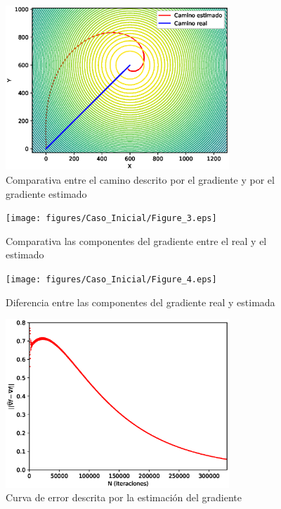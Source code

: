 \begin{figure}[htb]
\centering
\includegraphics[width=0.75\textwidth]{figures/Caso_Inicial/Caminos.eps}
\caption{Comparativa entre el camino descrito por el gradiente y por el gradiente estimado} \label{Dif_Caminos}
\end{figure}

\begin{figure}[H]
\centering
\texttt{[image: figures/Caso\_Inicial/Figure\_3.eps]}
\caption{Comparativa las componentes del gradiente entre el real y el estimado} \label{grad}
\end{figure}

\begin{figure}[H]
\centering
\texttt{[image: figures/Caso\_Inicial/Figure\_4.eps]}
\caption{Diferencia entre las componentes del gradiente real y estimada} \label{Dif_grad}
\end{figure}

\begin{figure}[H]
\centering
\includegraphics[width=0.75\textwidth]{figures/Caso_Inicial/Figure_5.eps}
\caption{Curva de error descrita por la estimación del gradiente} \label{Curva_error}
\end{figure}
\newpage

